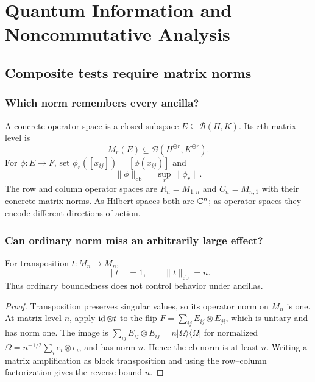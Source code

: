 \part{Quantum Information and Noncommutative Analysis}

\chapter{Composite tests require matrix norms}
\label{ch:operator-spaces}



\section{Which norm remembers every ancilla?}

A concrete operator space is a closed subspace
$E\subseteq\mathcal B(H,K)$.  Its $r$th matrix level is
\[
M_r(E)\subseteq\mathcal B(H^{\oplus r},K^{\oplus r}).
\]
For $\phi:E\to F$, set $\phi_r([x_{ij}])=[\phi(x_{ij})]$ and
\[
\|\phi\|_{\mathrm{cb}}=\sup_r\|\phi_r\|.
\]
The row and column operator spaces are
$R_n=M_{1,n}$ and $C_n=M_{n,1}$ with their concrete matrix norms.  As Hilbert
spaces both are $\mathbb C^n$; as operator spaces they encode different directions
of action.

\section{Can ordinary norm miss an arbitrarily large effect?}

\begin{theorem}
For transposition $t:M_n\to M_n$,
\[
\|t\|=1,
\qquad
\|t\|_{\mathrm{cb}}=n.
\]
Thus ordinary boundedness does not control behavior under ancillas.
\end{theorem}

\begin{proof}
Transposition preserves singular values, so its operator norm on $M_n$ is
one.  At matrix level $n$, apply $\operatorname{id}\otimes t$ to the flip
$F=\sum_{ij}E_{ij}\otimes E_{ji}$, which is unitary and has norm one.  The
image is
$\sum_{ij}E_{ij}\otimes E_{ij}=n|\Omega\rangle\langle\Omega|$ for normalized
$\Omega=n^{-1/2}\sum_i e_i\otimes e_i$, and has norm $n$.  Hence the cb norm
is at least $n$.  Writing a matrix amplification as block transposition and
using the row--column factorization gives the reverse bound $n$.
\end{proof}

